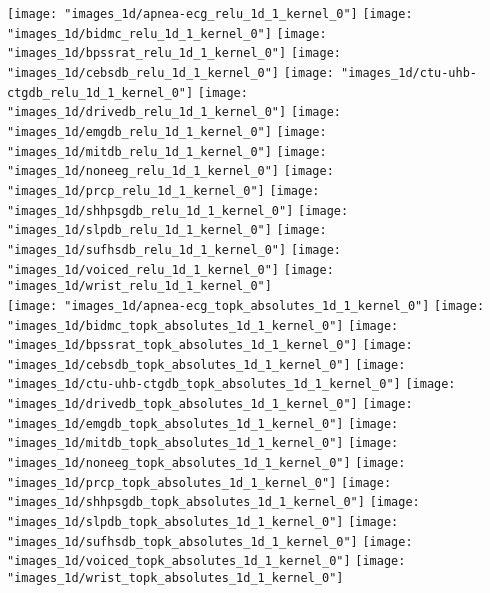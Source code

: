 \texttt{[image: "images\_1d/apnea-ecg\_relu\_1d\_1\_kernel\_0"]}
\texttt{[image: "images\_1d/bidmc\_relu\_1d\_1\_kernel\_0"]}
\texttt{[image: "images\_1d/bpssrat\_relu\_1d\_1\_kernel\_0"]}
\texttt{[image: "images\_1d/cebsdb\_relu\_1d\_1\_kernel\_0"]}
\texttt{[image: "images\_1d/ctu-uhb-ctgdb\_relu\_1d\_1\_kernel\_0"]}
\texttt{[image: "images\_1d/drivedb\_relu\_1d\_1\_kernel\_0"]}
\texttt{[image: "images\_1d/emgdb\_relu\_1d\_1\_kernel\_0"]}
\texttt{[image: "images\_1d/mitdb\_relu\_1d\_1\_kernel\_0"]}
\texttt{[image: "images\_1d/noneeg\_relu\_1d\_1\_kernel\_0"]}
\texttt{[image: "images\_1d/prcp\_relu\_1d\_1\_kernel\_0"]}
\texttt{[image: "images\_1d/shhpsgdb\_relu\_1d\_1\_kernel\_0"]}
\texttt{[image: "images\_1d/slpdb\_relu\_1d\_1\_kernel\_0"]}
\texttt{[image: "images\_1d/sufhsdb\_relu\_1d\_1\_kernel\_0"]}
\texttt{[image: "images\_1d/voiced\_relu\_1d\_1\_kernel\_0"]}
\texttt{[image: "images\_1d/wrist\_relu\_1d\_1\_kernel\_0"]}
\\
		\texttt{[image: "images\_1d/apnea-ecg\_topk\_absolutes\_1d\_1\_kernel\_0"]}
		\texttt{[image: "images\_1d/bidmc\_topk\_absolutes\_1d\_1\_kernel\_0"]}
		\texttt{[image: "images\_1d/bpssrat\_topk\_absolutes\_1d\_1\_kernel\_0"]}
		\texttt{[image: "images\_1d/cebsdb\_topk\_absolutes\_1d\_1\_kernel\_0"]}
		\texttt{[image: "images\_1d/ctu-uhb-ctgdb\_topk\_absolutes\_1d\_1\_kernel\_0"]}
		\texttt{[image: "images\_1d/drivedb\_topk\_absolutes\_1d\_1\_kernel\_0"]}
		\texttt{[image: "images\_1d/emgdb\_topk\_absolutes\_1d\_1\_kernel\_0"]}
		\texttt{[image: "images\_1d/mitdb\_topk\_absolutes\_1d\_1\_kernel\_0"]}
		\texttt{[image: "images\_1d/noneeg\_topk\_absolutes\_1d\_1\_kernel\_0"]}
		\texttt{[image: "images\_1d/prcp\_topk\_absolutes\_1d\_1\_kernel\_0"]}
		\texttt{[image: "images\_1d/shhpsgdb\_topk\_absolutes\_1d\_1\_kernel\_0"]}
		\texttt{[image: "images\_1d/slpdb\_topk\_absolutes\_1d\_1\_kernel\_0"]}
		\texttt{[image: "images\_1d/sufhsdb\_topk\_absolutes\_1d\_1\_kernel\_0"]}
		\texttt{[image: "images\_1d/voiced\_topk\_absolutes\_1d\_1\_kernel\_0"]}
		\texttt{[image: "images\_1d/wrist\_topk\_absolutes\_1d\_1\_kernel\_0"]}
